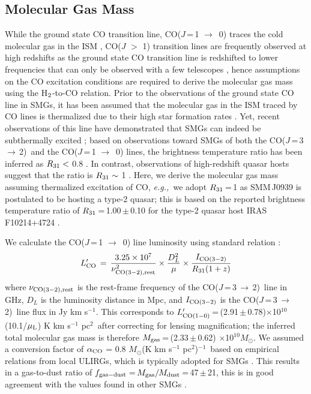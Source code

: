 \documentclass[twocolumn,apj,numberedappendix]{emulateapj}
\newcommand{\Msun}{\mbox{$M_{\odot}$}}
\newcommand{\rarr}{$\rightarrow$}
\newcommand{\CO}{\mbox{CO($J$\,=\,3\,$\rightarrow$\,2) }}
\newcommand{\LpU}{\mbox{K\,\,km\,\,s$^{-1}$\,\,pc$^2$}}
\newcommand{\eg}{{\sl e.g.,~}}
\newcommand{\pmOne}{\mbox{$^{-1}$}}
\begin{document}
\subsection{Molecular Gas Mass}
While the ground state CO transition line, CO($J$\,=\,1 \rarr\ 0) traces the cold molecular gas in the ISM
\citep*[\eg][]{Downes98a,Wilson70a}, CO($J$ $>$ 1) transition lines are frequently observed at high redshifts as the
 ground state CO transition line is redshifted to lower frequencies that can only be observed with a few telescopes 
 \citep{Carilli13a}, 
 hence assumptions on the CO excitation conditions are required to derive the molecular gas mass using the H$_{\rm 2}$-to-CO 
 relation. 
Prior to the observations of the ground state CO line in SMGs, it has been assumed that the molecular gas in the
  ISM traced by CO lines is thermalized due to their high star formation rates \citep[\eg][]{Greve05a, Coppin08a}.
   Yet, recent observations of this line have demonstrated that SMGs can indeed be subthermally excited
   \citep{Harris10a,Riechers11c,Riechers11d,Ivison11a}; based on observations toward SMGs of both the \CO and the CO($J$\,=\,1 \rarr\ 0) lines, the 
   brightness temperature ratio has been inferred as $R_{\rm 31}<$ 0.8 \citep
   {Harris10a,Carilli10a,Swinbank2010a,Riechers11d,Ivison11a,Ivison10d}. In contrast, observations of high-redshift quasar hosts suggest that the ratio 
   is $R_{\rm 31}\sim$ 1 \citep{Riechers06a, Riechers11a, Scott11a}. 
Here, we derive the molecular gas mass 
assuming thermalized excitation of CO, 
\eg we adopt $R_{\rm 31}$\,=\,1 as SMM\,J0939 is 
postulated to be hosting a type-2 quasar; this is based on the reported brightness temperature ratio of $R_{\rm 31}$\,=\,1.00\,$\pm$\,0.10 for the type-2 quasar host IRAS F10214+4724 \citep{Riechers11a}.
\par
We calculate the CO($J$\,=\,1 \rarr\ 0) line luminosity using standard relation 
\citep[\eg][]{Solomon05a,Carilli13a}:
\begin{equation}
L^{\prime}_{\rm CO}\,=\,\frac{3.25\times10^7}{\nu_{\rm CO (3-2), rest}^2}\times \frac{D_L^2}{\mu} \times
\frac{I_{\rm CO(3-2)}} {R_{\rm 31} (1 + z)}
\end{equation}
where $\nu_{\rm CO (3-2), rest}$ is the rest-frame frequency of the \CO line in GHz, $D_L$ is the luminosity distance in Mpc, and $I_{\rm CO(3-2)}$ is the \CO line flux in Jy km\,\,s\pmOne. This corresponds to $L^{\prime}_{\rm CO (1-0)}$\,=\,(2.91\,$\pm$\,0.78)$\times$10$^{10}$(10.1/$\mu_{\rm L}$) \LpU\ after correcting for lensing magnification; the inferred total molecular gas mass is therefore $M_{\rm gas}$\,=\,(2.33\,$\pm$\,0.62) $\times$10$^{10}$\Msun. We assumed a conversion factor of $\alpha_{\rm CO}$ =
0.8 \Msun (\LpU)\pmOne\ based on empirical relations from local ULIRGs, which is typically
adopted for SMGs \citep[\eg][]{Tacconi06a,Tacconi08a,Bothwell13a}. 
This results in a gas-to-dust
ratio of $f_{\rm gas-dust}$\,=\,$M_{\rm gas}/M_{\rm dust}$\,=\,47\,$\pm$\,21, this is in good agreement with the 
values found in other SMGs \citep{Coppin08a,Micha10a,Riechers11c}.
\end{document}
